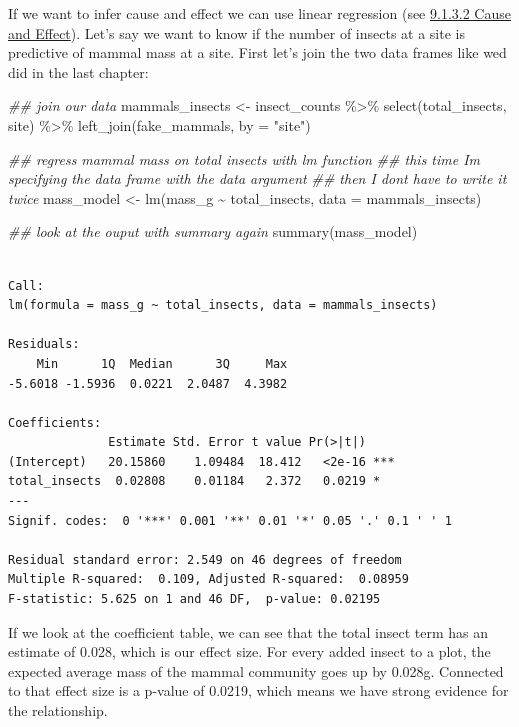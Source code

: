 \documentclass[
  letterpaper,
  DIV=11,
  numbers=noendperiod]{scrreprt}
\newenvironment{Shaded}{\begin{snugshade}}{\end{snugshade}}
\newcommand{\AttributeTok}[1]{\textcolor[rgb]{0.40,0.45,0.13}{#1}}
\newcommand{\DocumentationTok}[1]{\textcolor[rgb]{0.37,0.37,0.37}{\textit{#1}}}
\newcommand{\FunctionTok}[1]{\textcolor[rgb]{0.28,0.35,0.67}{#1}}
\newcommand{\NormalTok}[1]{\textcolor[rgb]{0.00,0.23,0.31}{#1}}
\newcommand{\OtherTok}[1]{\textcolor[rgb]{0.00,0.23,0.31}{#1}}
\newcommand{\SpecialCharTok}[1]{\textcolor[rgb]{0.37,0.37,0.37}{#1}}
\newcommand{\StringTok}[1]{\textcolor[rgb]{0.13,0.47,0.30}{#1}}
\begin{document}
If we want to infer cause and effect we can use linear regression (see
\hyperref[sec-reg]{9.1.3.2 Cause and Effect}). Let's say we want to know
if the number of insects at a site is predictive of mammal mass at a
site. First let's join the two data frames like wed did in the last
chapter:

\begin{Shaded}
\begin{Highlighting}[]
\DocumentationTok{\#\# join our data}
\NormalTok{mammals\_insects }\OtherTok{\textless{}{-}}\NormalTok{ insect\_counts }\SpecialCharTok{\%\textgreater{}\%}
  \FunctionTok{select}\NormalTok{(total\_insects, site) }\SpecialCharTok{\%\textgreater{}\%}
  \FunctionTok{left\_join}\NormalTok{(fake\_mammals, }\AttributeTok{by =} \StringTok{"site"}\NormalTok{)}

\DocumentationTok{\#\# regress mammal mass on total insects with lm function}
\DocumentationTok{\#\# this time I\textquotesingle{}m specifying the data frame with the data argument}
\DocumentationTok{\#\# then I don\textquotesingle{}t have to write it twice}
\NormalTok{mass\_model }\OtherTok{\textless{}{-}} \FunctionTok{lm}\NormalTok{(mass\_g }\SpecialCharTok{\textasciitilde{}}\NormalTok{ total\_insects, }\AttributeTok{data =}\NormalTok{ mammals\_insects)}

\DocumentationTok{\#\# look at the ouput with summary again}
\FunctionTok{summary}\NormalTok{(mass\_model)}
\end{Highlighting}
\end{Shaded}

\begin{verbatim}

Call:
lm(formula = mass_g ~ total_insects, data = mammals_insects)

Residuals:
    Min      1Q  Median      3Q     Max 
-5.6018 -1.5936  0.0221  2.0487  4.3982 

Coefficients:
              Estimate Std. Error t value Pr(>|t|)    
(Intercept)   20.15860    1.09484  18.412   <2e-16 ***
total_insects  0.02808    0.01184   2.372   0.0219 *  
---
Signif. codes:  0 '***' 0.001 '**' 0.01 '*' 0.05 '.' 0.1 ' ' 1

Residual standard error: 2.549 on 46 degrees of freedom
Multiple R-squared:  0.109, Adjusted R-squared:  0.08959 
F-statistic: 5.625 on 1 and 46 DF,  p-value: 0.02195
\end{verbatim}

If we look at the coefficient table, we can see that the total insect
term has an estimate of 0.028, which is our effect size. For every added
insect to a plot, the expected average mass of the mammal community goes
up by 0.028g. Connected to that effect size is a p-value of 0.0219,
which means we have strong evidence for the relationship.
\end{document}
